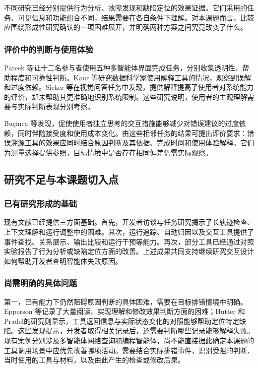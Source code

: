 \endgroup

不同研究已经分别提供行为分析、故障发现和缺陷定位的效果证据。它们采用的任务、可见信息和功能组合不同，结果需要在各自条件下理解。对本课题而言，比较应围绕形成性研究确认的一项困难展开，并明确两种方案之间究竟改变了什么。

\subsubsection{评价中的判断与使用体验}

Pareek 等\cite{ref58}让十二名参与者使用五种多智能体界面完成任务，分别收集透明性、帮助程度和可靠性判断。Kaur 等\cite{ref50}研究数据科学家使用解释工具的情况，观察到误解和过度依赖。Sieker 等\cite{ref56}在视觉问答任务中发现，提供解释提高了使用者对系统能力的评价，却未帮助其更准确地识别系统限制。这些研究说明，使用者的主观理解需要与实际判断表现分别考察。

Buçinca 等\cite{ref55}发现，促使使用者独立思考的交互措施能够减少对错误建议的过度依赖，同时伴随接受度和使用成本变化。由这些相邻任务的结果可提出评价要求：错误溯源工具的效果应同时结合原因判断及其依据、完成时间和使用体验解释。它们为测量选择提供参照，目标情境中是否存在相同偏差仍需实际观察。

\subsection{研究不足与本课题切入点}

\subsubsection{已有研究形成的基础}

现有文献已经提供三方面基础。首先，开发者访谈与任务研究揭示了长轨迹检查、上下文理解和运行调整中的困难。其次，运行追踪、自动归因以及交互工具提供了事件查找、关系展示、输出比较和运行干预等能力。再次，部分工具已经通过对照实验报告了行为分析或缺陷定位方面的改善。上述成果共同支持继续研究交互设计如何帮助开发者查明智能体失败原因。

\subsubsection{尚需明确的具体问题}

第一，已有能力下仍然阻碍原因判断的具体困难，需要在目标排错情境中明确。Epperson 等\cite{ref02}记录了大量阅读、实现理解和修改效果判断方面的困难；Hutter 和 Pradel\cite{ref18}的研究则显示，工具返回信息与实际状态变化的对照能够帮助定位特定缺陷。这些发现提示，开发者取得相关记录后，还需要判断哪些记录能够解释失败。现有案例分别涉及多智能体网络查询和编程智能体，尚不能直接据此确定本课题的工具调用场景中应优先改善哪项活动。需要结合实际排错事件，识别受阻的判断、当时使用的工具与材料，以及由此产生的检查或修改后果。

